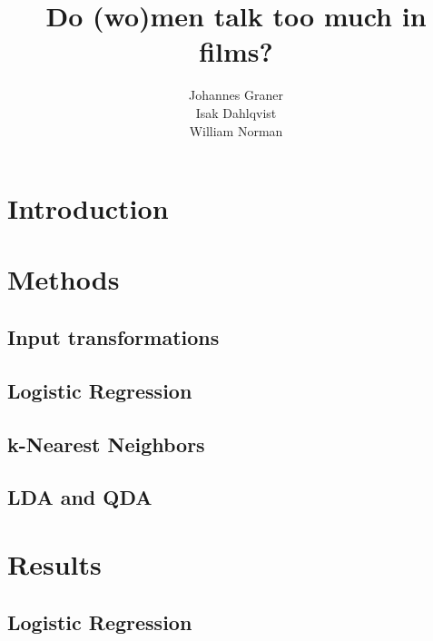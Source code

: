 \documentclass{article}
\title{Do (wo)men talk too much in films?}
\author{%
  Johannes Graner \\
  \And
  Isak Dahlqvist \\
  \AND
  William Norman \\
}
\begin{document}
\maketitle

\begin{abstract}
  
\end{abstract}

\newpage

\section{Introduction}



\section{Methods}



\subsection{Input transformations}



\subsection{Logistic Regression}



\subsection{k-Nearest Neighbors}



\subsection{LDA and QDA}



\section{Results}



\subsection{Logistic Regression}
\end{document}
